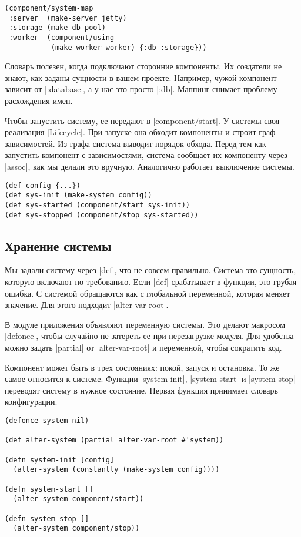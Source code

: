 \begin{verbatim}
(component/system-map
 :server  (make-server jetty)
 :storage (make-db pool)
 :worker  (component/using
           (make-worker worker) {:db :storage}))
\end{verbatim}

Словарь полезен, когда подключают сторонние компоненты. Их создатели не знают,
как заданы сущности в вашем проекте. Например, чужой компонент зависит от
\spverb|:database|, а у нас это просто \spverb|:db|. Маппинг снимает проблему
расхождения имен.

Чтобы запустить систему, ее передают в \spverb|component/start|. У системы своя
реализация \spverb|Lifecycle|. При запуске она обходит компоненты и строит граф
зависимостей. Из графа система выводит порядок обхода. Перед тем как запустить
компонент с зависимостями, система сообщает их компоненту через \spverb|assoc|,
как мы делали это вручную. Аналогично работает выключение системы.

\begin{verbatim}
(def config {...})
(def sys-init (make-system config))
(def sys-started (component/start sys-init))
(def sys-stopped (component/stop sys-started))
\end{verbatim}

\subsection{Хранение системы}

Мы задали систему через \spverb|def|, что не совсем правильно. Система это
сущность, которую включают по требованию. Если \spverb|def| срабатывает в
функции, это грубая ошибка. С системой обращаются как с глобальной переменной,
которая меняет значение. Для этого подходит \spverb|alter-var-root|.

В модуле приложения объявляют переменную системы. Это делают макросом
\spverb|defonce|, чтобы случайно не затереть ее при перезагрузке модуля. Для
удобства можно задать \spverb|partial| от \spverb|alter-var-root| и переменной,
чтобы сократить код.

Компонент может быть в трех состояниях: покой, запуск и остановка. То же самое
относится к системе. Функции \spverb|system-init|, \spverb|system-start| и
\spverb|system-stop| переводят систему в нужное состояние. Первая функция
принимает словарь конфигурации.

\begin{verbatim}
(defonce system nil)

(def alter-system (partial alter-var-root #'system))

(defn system-init [config]
  (alter-system (constantly (make-system config))))

(defn system-start []
  (alter-system component/start))

(defn system-stop []
  (alter-system component/stop))
\end{verbatim}

